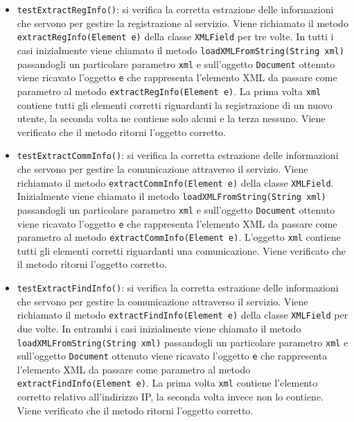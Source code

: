 {\begin{sloppypar}
{\begin{itemize}
\begin{itemize}
\begin{itemize}
						\item \texttt{testExtractRegInfo()}: si verifica la corretta estrazione delle informazioni che servono per gestire la registrazione al servizio. Viene richiamato il metodo \texttt{extractRegInfo(Element e)} della classe \texttt{XMLField} per tre volte. In tutti i casi inizialmente viene chiamato il metodo \texttt{loadXMLFromString(String xml)} passandogli un particolare parametro \texttt{xml} e sull'oggetto \texttt{Document} ottenuto viene ricavato l'oggetto \texttt{e} che rappresenta l'elemento XML da passare come parametro al metodo \texttt{extractRegInfo(Element e)}. La prima volta \texttt{xml} contiene tutti gli elementi corretti riguardanti la registrazione di un nuovo utente, la seconda volta ne contiene solo alcuni e la terza nessuno. Viene verificato che il metodo ritorni l'oggetto corretto.
						
						\item \texttt{testExtractCommInfo()}: si verifica la corretta estrazione delle informazioni che servono per gestire la comunicazione attraverso il servizio. Viene richiamato il metodo \texttt{extractCommInfo(Element e)} della classe \texttt{XMLField}. Inizialmente viene chiamato il metodo \texttt{loadXMLFromString(String xml)} passandogli un particolare parametro \texttt{xml} e sull'oggetto \texttt{Document} ottenuto viene ricavato l'oggetto \texttt{e} che rappresenta l'elemento XML da passare come parametro al metodo \texttt{extractCommInfo(Element e)}. L'oggetto \texttt{xml} contiene tutti gli elementi corretti riguardanti una comunicazione. Viene verificato che il metodo ritorni l'oggetto corretto.
						
						\item \texttt{testExtractFindInfo()}: si verifica la corretta estrazione delle informazioni che servono per gestire la comunicazione attraverso il servizio. Viene richiamato il metodo \texttt{extractFindInfo(Element e)} della classe \texttt{XMLField} per due volte. In entrambi i casi inizialmente viene chiamato il metodo \texttt{loadXMLFromString(String xml)} passandogli un particolare parametro \texttt{xml} e sull'oggetto \texttt{Document} ottenuto viene ricavato l'oggetto \texttt{e} che rappresenta l'elemento XML da passare come parametro al metodo \texttt{extractFindInfo(Element e)}. La prima volta \texttt{xml} contiene l'elemento corretto relativo all'indirizzo IP, la seconda volta invece non lo contiene. Viene verificato che il metodo ritorni l'oggetto corretto.
						

\end{itemize}
\end{itemize}
\end{itemize}}
\end{sloppypar}}
